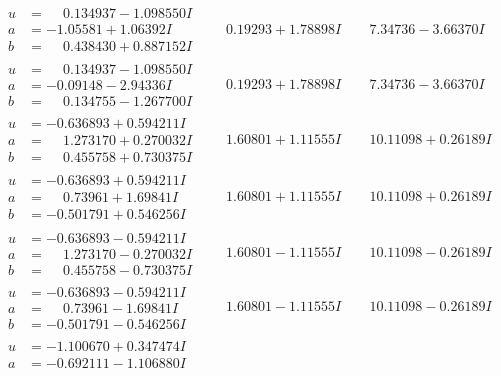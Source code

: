 \documentclass[1p]{elsarticle_modified}
\theoremstyle{definition}
\begin{document}
$$\begin{array}{c|c|c}
\begin{aligned}
u &= \phantom{-}0.134937 - 1.098550 I \\
a &= -1.05581 + 1.06392 I \\
b &= \phantom{-}0.438430 + 0.887152 I\end{aligned}
 & \phantom{-}0.19293 + 1.78898 I & \phantom{-}7.34736 - 3.66370 I \\ \hline\begin{aligned}
u &= \phantom{-}0.134937 - 1.098550 I \\
a &= -0.09148 - 2.94336 I \\
b &= \phantom{-}0.134755 - 1.267700 I\end{aligned}
 & \phantom{-}0.19293 + 1.78898 I & \phantom{-}7.34736 - 3.66370 I \\ \hline\begin{aligned}
u &= -0.636893 + 0.594211 I \\
a &= \phantom{-}1.273170 + 0.270032 I \\
b &= \phantom{-}0.455758 + 0.730375 I\end{aligned}
 & \phantom{-}1.60801 + 1.11555 I & \phantom{-}10.11098 + 0.26189 I \\ \hline\begin{aligned}
u &= -0.636893 + 0.594211 I \\
a &= \phantom{-}0.73961 + 1.69841 I \\
b &= -0.501791 + 0.546256 I\end{aligned}
 & \phantom{-}1.60801 + 1.11555 I & \phantom{-}10.11098 + 0.26189 I \\ \hline\begin{aligned}
u &= -0.636893 - 0.594211 I \\
a &= \phantom{-}1.273170 - 0.270032 I \\
b &= \phantom{-}0.455758 - 0.730375 I\end{aligned}
 & \phantom{-}1.60801 - 1.11555 I & \phantom{-}10.11098 - 0.26189 I \\ \hline\begin{aligned}
u &= -0.636893 - 0.594211 I \\
a &= \phantom{-}0.73961 - 1.69841 I \\
b &= -0.501791 - 0.546256 I\end{aligned}
 & \phantom{-}1.60801 - 1.11555 I & \phantom{-}10.11098 - 0.26189 I \\ \hline\begin{aligned}
u &= -1.100670 + 0.347474 I \\
a &= -0.692111 - 1.106880 I \\

\end{aligned}
\end{array}$$
\end{document}
